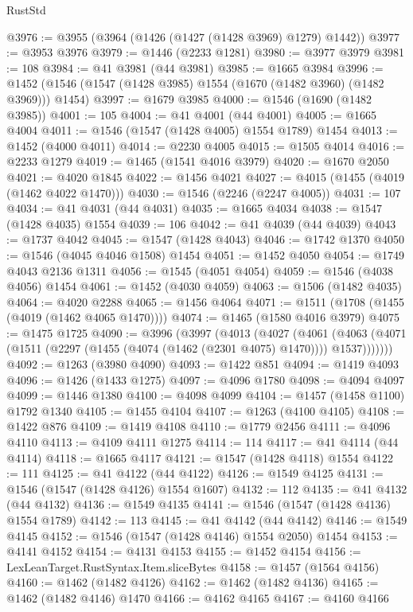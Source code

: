 \begin{lexlean}{RustStd}
\begin{coremodule}
@3976 := @3955 (@3964 (@1426 (@1427 (@1428 @3969) @1279) @1442))
@3977 := @3953 @3976
@3979 := @1446 (@2233 @1281)
@3980 := @3977 @3979
@3981 := 108
@3984 := @41 @3981 (@44 @3981)
@3985 := @1665 @3984
@3996 := @1452 (@1546 (@1547 (@1428 @3985) @1554 (@1670 (@1482 @3960) (@1482 @3969))) @1454)
@3997 := @1679 @3985
@4000 := @1546 (@1690 (@1482 @3985))
@4001 := 105
@4004 := @41 @4001 (@44 @4001)
@4005 := @1665 @4004
@4011 := @1546 (@1547 (@1428 @4005) @1554 @1789) @1454
@4013 := @1452 (@4000 @4011)
@4014 := @2230 @4005
@4015 := @1505 @4014
@4016 := @2233 @1279
@4019 := @1465 (@1541 @4016 @3979)
@4020 := @1670 @2050
@4021 := @4020 @1845
@4022 := @1456 @4021
@4027 := @4015 (@1455 (@4019 (@1462 @4022 @1470)))
@4030 := @1546 (@2246 (@2247 @4005))
@4031 := 107
@4034 := @41 @4031 (@44 @4031)
@4035 := @1665 @4034
@4038 := @1547 (@1428 @4035) @1554
@4039 := 106
@4042 := @41 @4039 (@44 @4039)
@4043 := @1737 @4042
@4045 := @1547 (@1428 @4043)
@4046 := @1742 @1370
@4050 := @1546 (@4045 @4046 @1508) @1454
@4051 := @1452 @4050
@4054 := @1749 @4043 @2136 @1311
@4056 := @1545 (@4051 @4054)
@4059 := @1546 (@4038 @4056) @1454
@4061 := @1452 (@4030 @4059)
@4063 := @1506 (@1482 @4035)
@4064 := @4020 @2288
@4065 := @1456 @4064
@4071 := @1511 (@1708 (@1455 (@4019 (@1462 @4065 @1470))))
@4074 := @1465 (@1580 @4016 @3979)
@4075 := @1475 @1725
@4090 := @3996
    (@3997
      (@4013
        (@4027
          (@4061
            (@4063 (@4071 (@1511 (@2297 (@1455 (@4074 (@1462 (@2301 @4075) @1470)))) @1537)))))))
@4092 := @1263 (@3980 @4090)
@4093 := @1422 @851
@4094 := @1419 @4093
@4096 := @1426 (@1433 @1275)
@4097 := @4096 @1780
@4098 := @4094 @4097
@4099 := @1446 @1380
@4100 := @4098 @4099
@4104 := @1457 (@1458 @1100) @1792 @1340
@4105 := @1455 @4104
@4107 := @1263 (@4100 @4105)
@4108 := @1422 @876
@4109 := @1419 @4108
@4110 := @1779 @2456
@4111 := @4096 @4110
@4113 := @4109 @4111 @1275
@4114 := 114
@4117 := @41 @4114 (@44 @4114)
@4118 := @1665 @4117
@4121 := @1547 (@1428 @4118) @1554
@4122 := 111
@4125 := @41 @4122 (@44 @4122)
@4126 := @1549 @4125
@4131 := @1546 (@1547 (@1428 @4126) @1554 @1607)
@4132 := 112
@4135 := @41 @4132 (@44 @4132)
@4136 := @1549 @4135
@4141 := @1546 (@1547 (@1428 @4136) @1554 @1789)
@4142 := 113
@4145 := @41 @4142 (@44 @4142)
@4146 := @1549 @4145
@4152 := @1546 (@1547 (@1428 @4146) @1554 @2050) @1454
@4153 := @4141 @4152
@4154 := @4131 @4153
@4155 := @1452 @4154
@4156 := LexLeanTarget.RustSyntax.Item.sliceBytes
@4158 := @1457 (@1564 @4156)
@4160 := @1462 (@1482 @4126)
@4162 := @1462 (@1482 @4136)
@4165 := @1462 (@1482 @4146) @1470
@4166 := @4162 @4165
@4167 := @4160 @4166

\end{coremodule}
\end{lexlean}

